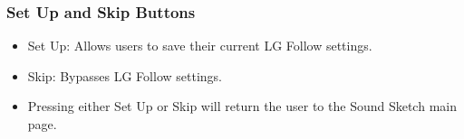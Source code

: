 \documentclass[conference]{IEEEtran}
\begin{document}
\subsubsection{Set Up and Skip Buttons}
\begin{itemize}
    \item Set Up: Allows users to save their current LG Follow settings.\\
    \item Skip: Bypasses LG Follow settings.\\
    \item Pressing either Set Up or Skip will return the user to the Sound Sketch main page.\\
\end{itemize}
\end{document}
